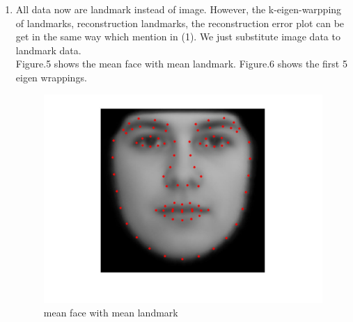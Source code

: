 \documentclass[12pt]{ctexart}
\begin{document}
\begin{enumerate}
\item
All data now are landmark instead of image. However, the k-eigen-warpping of landmarks, reconstruction landmarks, the reconstruction error plot can be get in the same way which mention in (1). We just substitute image data to landmark data. \\ 
Figure.5 shows the mean face with mean landmark. Figure.6 shows the first 5 eigen wrappings.
\begin{figure}[H]
  \centering
  \includegraphics[scale=0.2]{b_mean_lm.jpg} 
  \caption{mean face with mean landmark}
\end{figure}


\end{enumerate}
\end{document}
